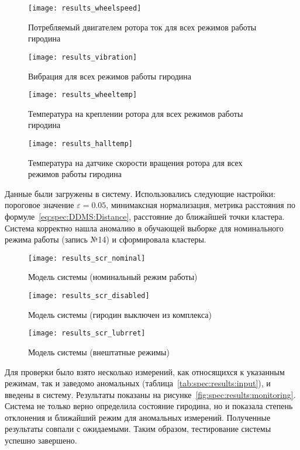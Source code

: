 \begin{figure}[h]
\texttt{[image: results\_wheelspeed]}
\caption{Потребляемый двигателем ротора ток для всех режимов работы гиродина}
\label{fig:spec:results:current}
\end{figure}

\begin{figure}[h]
\texttt{[image: results\_vibration]}
\caption{Вибрация для всех режимов работы гиродина}
\label{fig:spec:results:vibration}
\end{figure}

\begin{figure}[h]
\texttt{[image: results\_wheeltemp]}
\caption{Температура на креплении ротора для всех режимов работы гиродина}
\label{fig:spec:results:wheeltemp}
\end{figure}

\begin{figure}[h]
\texttt{[image: results\_halltemp]}
\caption{Температура на датчике скорости вращения ротора для всех режимов работы гиродина}
\label{fig:spec:results:halltemp}
\end{figure}

Данные были загружены в систему. Использовались следующие настройки: пороговое значение $\varepsilon=0.05$, минимаксная нормализация, метрика расстояния по формуле~\eqref{eq:spec:DDMS:Distance}, расстояние до ближайшей точки кластера. Система корректно нашла аномалию в обучающей выборке для номинального режима работы (запись №14) и сформировала кластеры.

\begin{figure}
\caption{Модель системы (номинальный режим работы)}
\label{fig:spec:results:scr:nominal}
\texttt{[image: results\_scr\_nominal]}
\end{figure}

\begin{figure}
\caption{Модель системы (гиродин выключен из комплекса)}
\label{fig:spec:results:scr:disabled}
\texttt{[image: results\_scr\_disabled]}
\end{figure}

\begin{figure}
\caption{Модель системы (внештатные режимы)}
\label{fig:spec:results:scr:lubrret}
\texttt{[image: results\_scr\_lubrret]}
\end{figure}

Для проверки было взято несколько измерений, как относящихся к указанным режимам, так и заведомо аномальных (таблица~\ref{tab:spec:results:input}), и введены в систему. Результаты показаны на рисунке~\ref{fig:spec:results:monitoring}. Система не только верно определила состояние гиродина, но и показала степень отклонения и ближайший режим для аномальных измерений. Полученные результаты совпали с ожидаемыми. Таким образом, тестирование системы успешно завершено.

